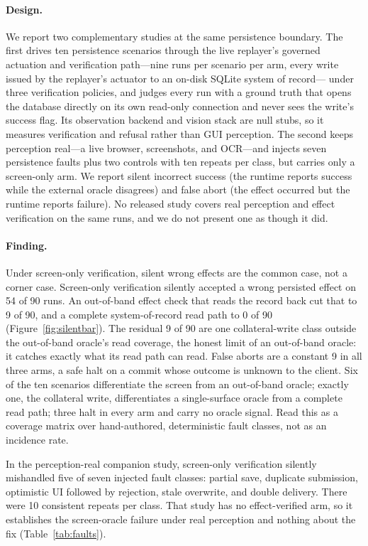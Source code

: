 \documentclass[10pt]{article}
\begin{document}
\paragraph{Design.} We report two complementary studies at the same persistence
boundary. The first drives ten persistence scenarios through the live replayer's
governed actuation and verification path---nine runs per scenario per arm, every
write issued by the replayer's actuator to an on-disk SQLite system of record---
under three verification policies, and judges every run with a ground truth that
opens the database directly on its own read-only connection and never sees the
write's success flag. Its observation backend and vision stack are null stubs,
so it measures verification and refusal rather than GUI perception. The second
keeps perception real---a live browser, screenshots, and OCR---and injects seven
persistence faults plus two controls with ten repeats per class, but carries
only a screen-only arm. We report silent incorrect success (the runtime reports
success while the external oracle disagrees) and false abort (the effect
occurred but the runtime reports failure). No released study covers real
perception and effect verification on the same runs, and we do not present one
as though it did.

\paragraph{Finding.} Under screen-only verification, silent wrong effects are the
common case, not a corner case. Screen-only verification silently accepted a
wrong persisted effect on 54
of 90 runs. An out-of-band effect check that reads the record back cut that to 9
of 90, and a complete system-of-record read path to 0 of 90
(Figure~\ref{fig:silentbar}). The residual 9 of 90 are one collateral-write class
outside the out-of-band oracle's read coverage, the honest limit of an
out-of-band oracle: it catches exactly what its read path can read. False aborts
are a constant 9 in all three arms, a safe halt on a commit whose outcome is
unknown to the client. Six of the ten scenarios differentiate the screen from an
out-of-band oracle; exactly one, the collateral write, differentiates a
single-surface oracle from a complete read path; three halt in every arm and
carry no oracle signal. Read this as a coverage matrix over hand-authored,
deterministic fault classes, not as an incidence rate.

In the perception-real companion study, screen-only
verification silently mishandled five of seven injected fault classes: partial
save, duplicate submission, optimistic UI followed by rejection, stale overwrite,
and double delivery. There were 10 consistent repeats per class. That study has
no effect-verified arm, so it establishes the screen-oracle failure under real
perception and nothing about the fix (Table~\ref{tab:faults}).
\end{document}
